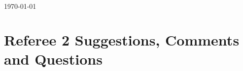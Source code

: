 \documentclass[11pt,english]{article}
\begin{document}


\makeatletter
{\def\@currentlabel{1}\label{introduction}}
{\def\@currentlabel{2}\label{institutions}}
{\def\@currentlabel{3}\label{identification}}
{\def\@currentlabel{1}\label{eq:main}}
{\def\@currentlabel{4}\label{results}}
{\def\@currentlabel{4.1}\label{main_results}}
{\def\@currentlabel{4.2}\label{sec:spillovers}}
{\def\@currentlabel{4.3}\label{heterogeneity}}
{\def\@currentlabel{4.4}\label{mechanisms}}
{\def\@currentlabel{5}\label{conclusions}}
{\def\@currentlabel{A}\label{sec:appendixA}}
{\def\@currentlabel{B}\label{sec:appendixB}}
{\def\@currentlabel{B.4}\label{resources_plan_cuadrante}}
{\def\@currentlabel{C}\label{sec:appendixC}}
{\def\@currentlabel{C.4}\label{sec:admin_uncapped}}
{\def\@currentlabel{C.5}\label{sec:bonferroni}}
{\def\@currentlabel{C.8}\label{sec:earthquake}}
\makeatother

\doublespacing
\begin{flushright}
\today \\[24pt]
\end{flushright}
\setcounter{Ref}{2}
\setcounter{RefComment}{0}
\setcounter{table}{0}
\setcounter{figure}{0}
\section*{Referee 2 Suggestions, Comments and Questions}

\FloatBarrier
\end{document}
